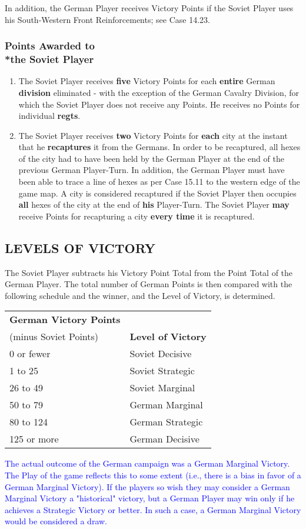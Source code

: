 In addition, the German Player receives Victory Points if the Soviet Player uses his South-Western Front Reinforcements; see Case 14.23.

\subsubsection{Points Awarded to\\*the Soviet Player}

\begin{enumerate}
  \item The Soviet Player receives \textbf{five} Victory Points for each \textbf{entire} German \textbf{division} eliminated - with the exception of the German Cavalry Division, for which the Soviet Player does not receive any Points. He receives no Points for individual \textbf{regts}.
  \item The Soviet Player receives \textbf{two} Victory Points for \textbf{each} city at the instant that he \textbf{recaptures} it from the Germans. In order to be recaptured, all hexes of the city had to have been held by the German Player at the end of the previous German Player-Turn. In addition, the German Player must have been able to trace a line of hexes as per Case 15.11 to the western edge of the game map. A city is considered recaptured if the Soviet Player then occupies \textbf{all} hexes of the city at the end of \textbf{his} Player-Turn. The Soviet Player \textbf{may} receive Points for recapturing a city \textbf{every time} it is recaptured.
\end{enumerate}

\subsection{LEVELS OF VICTORY}

The Soviet Player subtracts his Victory Point Total from the Point Total of the German Player. The total number of German Points is then compared with the following schedule and the winner, and the Level of Victory, is determined.

\begin{tabular}{ll}
  \textbf{German Victory Points} &\\
  (minus Soviet Points) & \textbf{Level of Victory}\\
  0 or fewer & Soviet Decisive\\
  1 to 25 & Soviet Strategic\\
  26 to 49 & Soviet Marginal\\
  50 to 79 & German Marginal\\
  80 to 124 & German Strategic\\
  125 or more & German Decisive
\end{tabular}

\textcolor{blue}{The actual outcome of the German campaign was a German Marginal Victory. The Play of the game reflects this to some extent (i.e., there is a bias in favor of a German Marginal Victory). If the players so wish they may consider a German Marginal Victory a "historical" victory, but a German Player may win only if he achieves a Strategic Victory or better. In such a case, a German Marginal Victory would be considered a draw.}